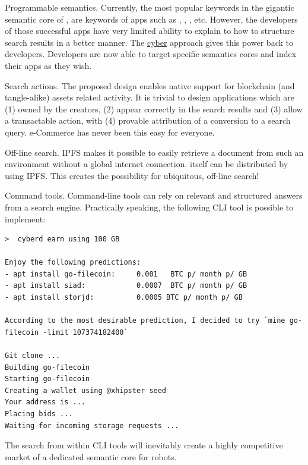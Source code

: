 \documentclass[8pt,oneside]{amsart}
\newcommand{\linkred}[2]{\href{#1}{\color{red}{#2}}}
\begin{document}
Programmable semantics. Currently, the most popular keywords in the gigantic semantic core of \linkred{https://google.com}{Google}, are keywords of apps such as \linkred{https://youtube.com}{Youtube}, \linkred{https://facebook.com}{Facebook}, \linkred{https://github.com}{GitHub}, etc. However, the developers of those successful apps have very limited ability to explain to \linkred{https://google.com}{Google} how to structure search results in a better manner. The {\hyperref[cyber]{cyber}} approach gives this power back to developers. Developers are now able to target specific semantics cores and index their apps as they wish.

Search actions. The proposed design enables native support for blockchain (and tangle-alike) assets related activity. It is trivial to design applications which are (1) owned by the creators, (2) appear correctly in the search results and (3) allow a transactable action, with (4) provable attribution of a conversion to a search query. e-Commerce has never been this easy for everyone.

Off-line search. IPFS makes it possible to easily retrieve a document from such an environment without a global internet connection. \linkred{https://github.com/cybercongress/cyberd}{cyberd} itself can be distributed by using IPFS. This creates the possibility for ubiquitous, off-line search!

Command tools. Command-line tools can rely on relevant and structured answers from a search engine. Practically speaking, the following CLI tool is possible to implement:

\begin{lstlisting}
>  cyberd earn using 100 GB

Enjoy the following predictions:
- apt install go-filecoin:     0.001   BTC p/ month p/ GB
- apt install siad:            0.0007  BTC p/ month p/ GB
- apt install storjd:          0.0005 BTC p/ month p/ GB

According to the most desirable prediction, I decided to try `mine go-filecoin -limit 107374182400`

Git clone ...
Building go-filecoin
Starting go-filecoin
Creating a wallet using @xhipster seed
Your address is ...
Placing bids ...
Waiting for incoming storage requests ...
\end{lstlisting}

The search from within CLI tools will inevitably create a highly competitive market of a dedicated semantic core for robots.
\end{document}
